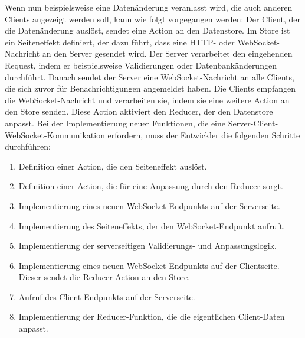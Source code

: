 \documentclass[12pt]{article} %
\begin{document}
Wenn nun beispielsweise eine Datenänderung veranlasst wird, die auch anderen Clients angezeigt werden soll, kann wie folgt vorgegangen werden: Der Client, der die Datenänderung auslöst, sendet eine Action an den Datenstore. Im Store ist ein Seiteneffekt definiert, der dazu führt, dass eine HTTP- oder WebSocket-Nachricht an den Server gesendet wird. Der Server verarbeitet den eingehenden Request, indem er beispielsweise Validierungen oder Datenbankänderungen durchführt. Danach sendet der Server eine WebSocket-Nachricht an alle Clients, die sich zuvor für Benachrichtigungen angemeldet haben. Die Clients empfangen die WebSocket-Nachricht und verarbeiten sie, indem sie eine weitere Action an den Store senden. Diese Action aktiviert den Reducer, der den Datenstore anpasst. Bei der Implementierung neuer Funktionen, die eine Server-Client-WebSocket-Kommunikation erfordern, muss der Entwickler die folgenden Schritte durchführen:
\begin{enumerate}
    \item Definition einer Action, die den Seiteneffekt auslöst.
    \item Definition einer Action, die für eine Anpassung durch den Reducer sorgt.
    \item Implementierung eines neuen WebSocket-Endpunkts auf der Serverseite.
    \item Implementierung des Seiteneffekts, der den WebSocket-Endpunkt aufruft.
    \item Implementierung der serverseitigen Validierungs- und Anpassungslogik.
    \item Implementierung eines neuen WebSocket-Endpunkts auf der Clientseite. Dieser sendet die Reducer-Action an den Store.
    \item Aufruf des Client-Endpunkts auf der Serverseite.
    \item Implementierung der Reducer-Funktion, die die eigentlichen Client-Daten anpasst.
\end{enumerate}
\end{document}
